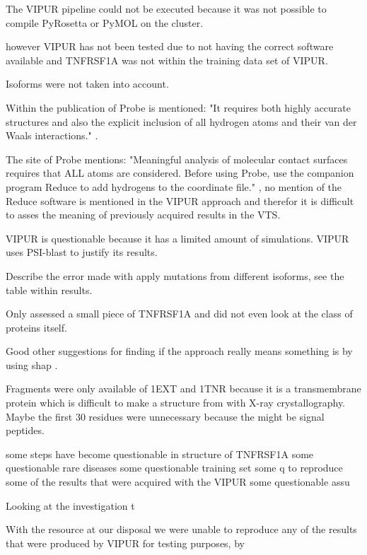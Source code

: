 The VIPUR pipeline could not be executed because it was not possible to compile PyRosetta or PyMOL on the cluster.

however VIPUR has not been tested due to not having the correct software available and TNFRSF1A was not within the training data set of VIPUR. 

Isoforms were not taken into account.

Within the publication of Probe is mentioned: "It requires both highly accurate structures and also the explicit inclusion of all hydrogen atoms and their van der Waals interactions." \cite{}.

The site of Probe mentions: "Meaningful analysis of molecular contact surfaces requires that ALL atoms are considered. Before using Probe, use the companion program Reduce to add hydrogens to the coordinate file." \cite{}, no mention of the Reduce software is mentioned in the VIPUR approach and therefor it is difficult to asses the meaning of previously acquired results in the VTS.

VIPUR is questionable because it has a limited amount of simulations.
VIPUR uses PSI-blast to justify its results.

Describe the error made with apply mutations from different isoforms, see the table within results.

Only assessed a small piece of TNFRSF1A and did not even look at the class of proteins itself.


Good other suggestions for finding if the approach really means something is by using shap \cite{}.


Fragments were only available of 1EXT and 1TNR because it is a transmembrane protein which is difficult to make a structure from with X-ray crystallography.
Maybe the first 30 residues were unnecessary because the might be signal peptides. 


 some steps have become questionable in structure of TNFRSF1A some questionable  rare diseases  some questionable  training set some q to reproduce some of the results that were acquired with the VIPUR some questionable assu


Looking at the investigation t

With the resource at our disposal we were unable to reproduce any of the results that were produced by VIPUR for testing purposes, by 